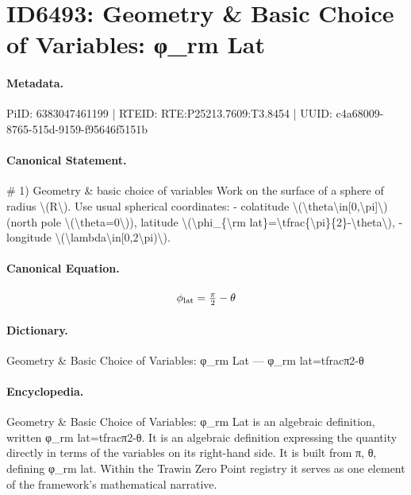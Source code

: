 \section*{ID6493: Geometry \& Basic Choice of Variables: φ\_rm Lat}
\paragraph{Metadata.}
PiID: 6383047461199 | RTEID: RTE:P25213.7609:T3.8454 | UUID: c4a68009-8765-515d-9159-f95646f5151b

\paragraph{Canonical Statement.}
\# 1) Geometry \& basic choice of variables Work on the surface of a sphere of radius \textbackslash{}(R\textbackslash{}). Use usual spherical coordinates: - colatitude \textbackslash{}(\textbackslash{}theta\textbackslash{}in[0,\textbackslash{}pi]\textbackslash{}) (north pole \textbackslash{}(\textbackslash{}theta=0\textbackslash{})), latitude \textbackslash{}(\textbackslash{}phi\_\{\textbackslash{}rm lat\}=\textbackslash{}tfrac\{\textbackslash{}pi\}\{2\}-\textbackslash{}theta\textbackslash{}), - longitude \textbackslash{}(\textbackslash{}lambda\textbackslash{}in[0,2\textbackslash{}pi)\textbackslash{}).

\paragraph{Canonical Equation.}
\[
\phi_{\rm lat}=\tfrac{\pi}{2}-\theta
\]

\paragraph{Dictionary.}
Geometry \& Basic Choice of Variables: φ\_rm Lat — φ\_rm lat=tfracπ2-θ

\paragraph{Encyclopedia.}
Geometry \& Basic Choice of Variables: φ\_rm Lat is an algebraic definition, written φ\_rm lat=tfracπ2-θ. It is an algebraic definition expressing the quantity directly in terms of the variables on its right-hand side. It is built from π, θ, defining φ\_rm lat. Within the Trawin Zero Point registry it serves as one element of the framework's mathematical narrative.
